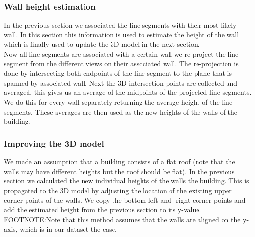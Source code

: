 \documentclass[10pt]{article}
\begin{document}



	

\subsubsection{Wall height estimation}
  	In the previous section we associated the line segments with their most
	likely wall. In this section this information is used to estimate the height of the
	wall which is finally used to update the 3D model in the next section.
	\\
	Now all line segments are associated with a certain wall we re-project the
	line segment from the different views on their associated wall. The
	re-projection is done by intersecting both endpoints of the line segment to
	the plane that is spanned by associated wall.
	Next the 3D intersection points are collected and averaged, this gives us
	an average of the midpoints of the projected line segments. We do this for
	every wall separately returning the average height of the line segments.
	These averages are then used as the new heights of the walls of the building.

\subsubsection{Improving the 3D model} 
	We made an assumption that a building consists of a flat roof (note that the walls may have different heights but the roof should be flat).
	In the previous section we calculated the new individual heights of the walls the building. 
	This is propagated to the 3D model by adjusting the location of the existing upper corner points of the walls. We copy the bottom left and -right corner points and add the estimated height from the previous section to its y-value.
	FOOTNOTE:Note that this method assumes that the walls are aligned on the y-axis, which is in our dataset the case.
\end{document}
